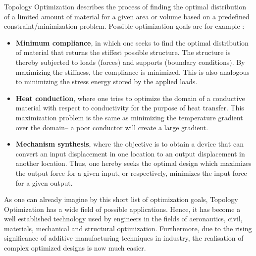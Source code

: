 \label{sec:TopOpt}
Topology Optimization describes the process of finding the optimal distribution of a limited amount of material for a given area or volume based on a predefined constraint/minimization problem. Possible optimization goals are for example \cite{Hunter2009}:
\begin{itemize}
\item \textbf{Minimum compliance}, in which one seeks to find the optimal distribution of material that returns the stiffest possible structure. The structure is thereby subjected to loads (forces) and supports (boundary conditions). By maximizing the stiffness, the compliance is minimized. This is also analogous to minimizing the stress energy stored by the applied loads.
\item \textbf{Heat conduction}, where one tries to optimize the domain of a conductive material with respect to conductivity for the purpose of heat transfer. This maximization problem is the same as minimizing the temperature gradient over the domain-- a poor conductor will create a large gradient.
\item \textbf{Mechanism synthesis}, where the objective is to obtain a device that can convert an input displacement in one location to an output displacement in another location. Thus, one hereby seeks the optimal design which maximizes the output force for a given input, or respectively, minimizes the input force for a given output.
\end{itemize}


As one can already imagine by this short list of optimization goals, Topology Optimization has a wide field of possible applications. Hence, it has become a well established technology used by engineers in the fields of aeronautics, civil, materials, mechanical and structural optimization. Furthermore, due to the rising significance of additive manufacturing techniques in industry, the realisation of complex optimized designs is now much easier. %

\label{subsec:TopOpTheory}
